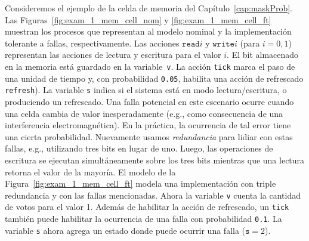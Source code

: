 Consideremos el ejemplo de la celda de memoria del Capítulo~\ref{cap:maskProb}. 
Las Figuras~\ref{fig:exam_1_mem_cell_nom} y  \ref{fig:exam_1_mem_cell_ft} muestran los procesos que representan al modelo nominal y la implementación tolerante a fallas, respectivamente. 
Las acciones $\texttt{read}i$
y $\texttt{write}i$ (para $i=0,1$) representan las acciones de lectura y escritura para el valor $i$.  El bit almacenado en la memoria está guardado en la variable~\texttt{v}.  La acción \texttt{tick} marca el paso de una unidad de tiempo y, con probabilidad \texttt{0.05}, habilita una acción de refrescado \texttt{refresh}). La variable \texttt{s}
indica si el sistema está en modo lectura/escritura, o produciendo un refrescado.
Una falla potencial en este escenario ocurre cuando una celda cambia de valor inesperadamente (e.g., como consecuencia de una interferencia electromagnética).
En la práctica, la ocurrencia de tal error tiene una cierta probabilidad. Nuevamente usamos  \emph{redundancia} para lidiar con estas fallas, %
e.g., utilizando tres bits en lugar de uno. Luego, las operaciones de escritura se ejecutan simultáneamente sobre los tres bits mientras que una lectura retorna el valor de la mayoría.
El modelo de la Figura~\ref{fig:exam_1_mem_cell_ft} modela una implementación con triple redundancia y con las fallas mencionadas.  Ahora la variable \texttt{v} cuenta la cantidad de votos para el valor 1. Además de habilitar la acción de refrescado, un \texttt{tick} también puede habilitar la ocurrencia de una falla con probabilidad \texttt{0.1}.
%
La variable \texttt{s} ahora agrega un estado donde  puede ocurrir una falla ($\texttt{s}=2$).

